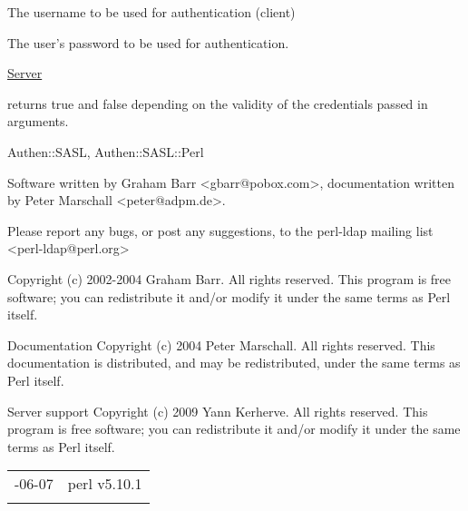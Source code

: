 \documentclass[]{article}
\renewcommand{\emph}[1]{\underline{#1}}
\begin{document}
\begin{description}
\itemsep1pt\parskip0pt
\item[user]
The username to be used for authentication (client)
\end{description}

\begin{description}
\itemsep1pt\parskip0pt
\item[pass]
The user's password to be used for authentication.
\end{description}

\emph{Server}

\begin{description}
\itemsep1pt\parskip0pt
\item[checkpass(username, password, realm)]
returns true and false depending on the validity of the credentials
passed in arguments.
\end{description}


Authen::SASL, Authen::SASL::Perl


Software written by Graham Barr
\textless{}gbarr@pobox.com\textgreater{}, documentation written by Peter
Marschall \textless{}peter@adpm.de\textgreater{}.

Please report any bugs, or post any suggestions, to the perl-ldap
mailing list \textless{}perl-ldap@perl.org\textgreater{}


Copyright (c) 2002-2004 Graham Barr. All rights reserved. This program
is free software; you can redistribute it and/or modify it under the
same terms as Perl itself.

Documentation Copyright (c) 2004 Peter Marschall. All rights reserved.
This documentation is distributed, and may be redistributed, under the
same terms as Perl itself.

Server support Copyright (c) 2009 Yann Kerherve. All rights reserved.
This program is free software; you can redistribute it and/or modify it
under the same terms as Perl itself.

\begin{longtable}[c]{@{}ll@{}}
\toprule\addlinespace
2010-06-07 & perl v5.10.1
\\\addlinespace
\bottomrule
\end{longtable}
\end{document}
